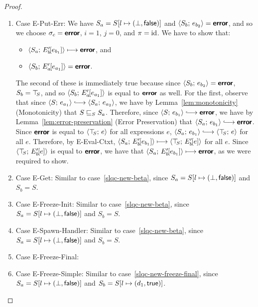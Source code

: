 \begin{proof}
\begin{enumerate}
\begin{enumerate}
    \item \label{slqc-new-put-err}Case {\sc E-Put-Err}: We have $S_a =
      S[l \mapsto (\bot, \textsf{false})]$ and $\langle S_b;\, e_{b_2} \rangle =
      \textbf{\textsf{error}}$, and so we choose $\sigma_c = \textbf{\textsf{error}}$, $i = 1$, $j = 0$,
      and $\pi = \mathrm{id}$.  We have to show that:
      \begin{itemize}
      \item $\langle S_a;\, E'_b\hspace{-1mm}\left[e_{b_1}\right] \rangle \longmapsto
        \textbf{\textsf{error}}$, and
      \item
        $\langle S_b;\, E'_a\hspace{-1mm}\left[e_{a_1}\right] \rangle = \textbf{\textsf{error}}$.
      \end{itemize}

      The second of these is immediately true because since
      $\langle S_b;\, e_{b_2} \rangle = \textbf{\textsf{error}}$, $S_b = \top\hspace{-0.85mm}_{S}$, and so
      $\langle S_b;\, E'_a\hspace{-1mm}\left[e_{a_1}\right] \rangle$ is equal to $\textbf{\textsf{error}}$ as
      well.  For the first, observe that since $\config{S}{e_{a_1}}
      \parstepsto \config{S_a}{e_{a_2}}$, we have by
      Lemma~\ref{lem:monotonicity} (Monotonicity) that
      $S \sqsubseteq_S S_a$.  Therefore, since $\config{S}{e_{b_1}}
      \parstepsto \error$, we have by
      Lemma~\ref{lem:error-preservation} (Error Preservation) that
      $\config{S_a}{e_{b_1}} \parstepsto \error$.  Since $\textbf{\textsf{error}}$ is
      equal to $\langle \top\hspace{-0.85mm}_{S};\, e \rangle$ for all expressions $e$,
      $\config{S_a}{e_{b_1}} \parstepsto \config{\topS}{e}$ for all
      $e$.  Therefore, by {\sc E-Eval-Ctxt},
      $\langle S_a;\, E'_b\hspace{-1mm}\left[e_{b_1}\right] \rangle \longmapsto
      \langle \top\hspace{-0.85mm}_{S};\, E'_b\hspace{-1mm}\left[e\right] \rangle$ for all $e$.  Since
      $\langle \top\hspace{-0.85mm}_{S};\, E'_b\hspace{-1mm}\left[e\right] \rangle$ is equal to $\textbf{\textsf{error}}$, we
      have that $\langle S_a;\, E'_b\hspace{-1mm}\left[e_{b_1}\right] \rangle \longmapsto
      \textbf{\textsf{error}}$, as we were required to show.

    \item \label{slqc-new-get}Case {\sc E-Get}: Similar to
      case~\ref{slqc-new-beta}, since $S_a =
      S[l \mapsto (\bot, \textsf{false})]$ and $S_b = S$.
    \item \label{slqc-new-freeze-init}Case {\sc E-Freeze-Init}:
      Similar to case~\ref{slqc-new-beta}, since $S_a =
      S[l \mapsto (\bot, \textsf{false})]$ and $S_b = S$.
    \item \label{slqc-new-spawn-handler}Case {\sc E-Spawn-Handler}:
      Similar to case~\ref{slqc-new-beta}, since $S_a =
      S[l \mapsto (\bot, \textsf{false})]$ and $S_b = S$.
    \item \label{slqc-new-freeze-final}Case {\sc E-Freeze-Final}: \TODO{}
    \item \label{slqc-new-freeze-simple}Case {\sc E-Freeze-Simple}:
      Similar to case~\ref{slqc-new-freeze-final}, since $S_a =
      S[l \mapsto (\bot, \textsf{false})]$ and $S_b =
      S[l \mapsto (d_1, \textsf{true})]$.


\end{enumerate}
\end{enumerate}
\end{proof}
